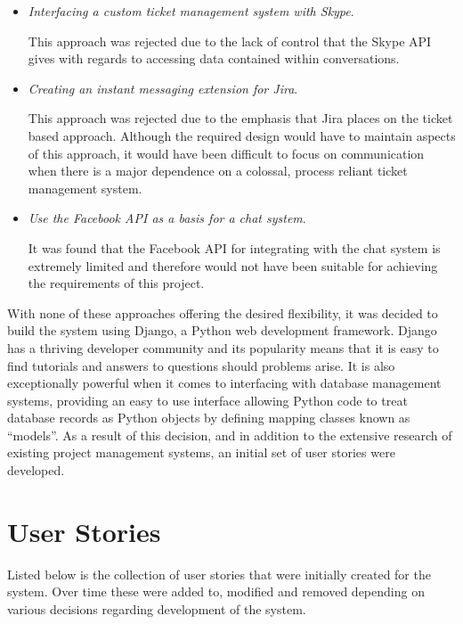 \documentclass[a4paper]{l3proj}
\begin{document}
\begin{itemize}
\item \textit{Interfacing a custom ticket management system with Skype}. \par This approach was rejected due to the lack of control that the Skype API gives with regards to accessing data contained within conversations.
\item \textit{Creating an instant messaging extension for Jira}. \par This approach was rejected due to the emphasis that Jira places on the ticket based approach. Although the required design would have to maintain aspects of this approach, it would have been difficult to focus on communication when there is a major dependence on a colossal, process reliant ticket management system.
\item \textit{Use the Facebook API as a basis for a chat system}. \par  It was found that the Facebook API for integrating with the chat system is extremely limited and therefore would not have been suitable for achieving the requirements of this project.

\end{itemize}

With none of these approaches offering the desired flexibility, it was decided to build the system using Django, a Python web development framework. Django has a thriving developer community and its popularity means that it is easy to find tutorials and answers to questions should problems arise. It is also exceptionally powerful when it comes to interfacing with database management systems, providing an easy to use interface allowing Python code to treat database records as Python objects by defining mapping classes known as “models”. As a result of this decision, and in addition to the extensive research of existing project management systems, an initial set of user stories were developed.

\section{User Stories}
\label{userStories}

Listed below is the collection of user stories that were initially created for the system.  Over time these were added to, modified and removed depending on various decisions regarding development of the system.
\end{document}
